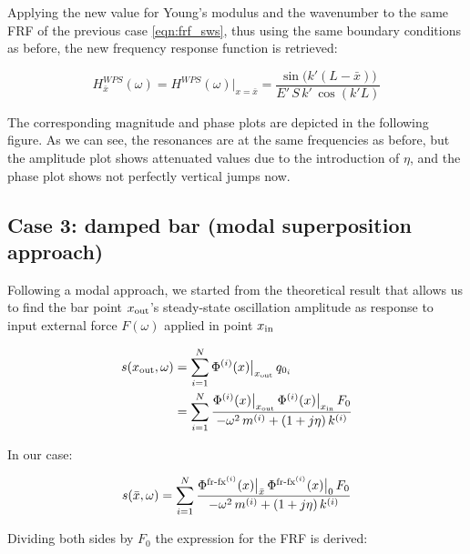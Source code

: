 \documentclass[a4paper,12pt,oneside]{article}
\begin{document}
Applying the new value for Young's modulus and the wavenumber to the same FRF of the previous case \eqref{eqn:frf_sws}, thus using the same boundary conditions as before, the new frequency response function is retrieved:

\[
	H^{WPS}_{\bar{x}}(\omega) = H^{WPS}(\omega)\big|_{x = \bar{x}} = %
		\frac{\sin\bigl(k'(L - \bar{x})\bigr)}{E' \, S \, k' \, \cos(k'L)}
\]

\vspace{10pt}

The corresponding magnitude and phase plots are depicted in the following figure. As we can see, the resonances are at the same frequencies as before, but the amplitude plot shows attenuated values due to the introduction of $ \eta $, and the phase plot shows not perfectly vertical jumps now.

\begin{figure}[h]
	\vspace{50pt}
	\centering
	\def\svgwidth{\columnwidth}
	
\end{figure}

\subsection*{Case 3: damped bar (modal superposition approach)}

Following a modal approach, we started from the theoretical result that allows us to find the bar point $ x_\textup{out} $'s steady-state oscillation amplitude as response to input external force $ F(\omega) $ applied in point $ x_\textup{in} $

\[ \begin{split}
	s(x_\textup{out}, \omega) & = %
		\sum_{i=1}^N \Phi^{(i)}(x)\big|_{x_\textup{out}} \, q_{0_i} \\
	& = \sum_{i=1}^N \frac{\Phi^{(i)}(x)\big|_{x_\textup{out}} \, %
		\Phi^{(i)}(x)\big|_{x_\textup{in}} \, F_0} %
		{-\omega^2 \, m^{(i)} + (1 + j \eta) \, k^{(i)}}
\end{split} \]

In our case:

\[ \begin{split}
	s(\bar{x},\omega) =
		\sum_{i=1}^N \frac{\Phi^{\textup{fr-fx}^{(i)}}(x)\big|_{\bar{x}} \,
		\Phi^{\textup{fr-fx}^{(i)}}(x)\big|_0 \, F_0}
		{-\omega^2 \, m^{(i)} + (1 + j \eta) \, k^{(i)}}
\end{split} \]

Dividing both sides by $ F_0 $ the expression for the FRF is derived:
\end{document}
